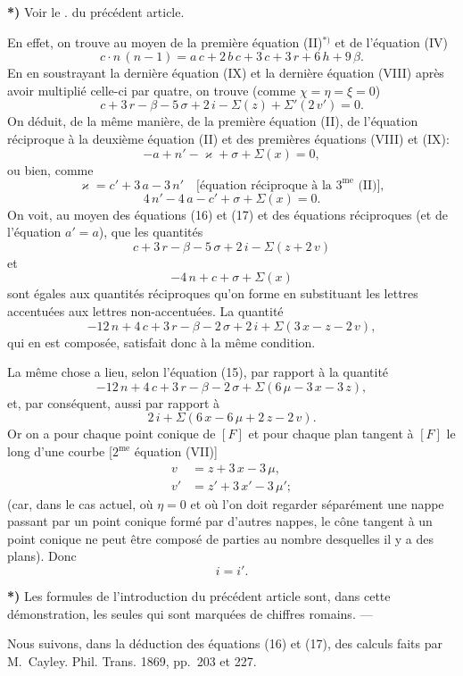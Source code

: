 \documentclass{article}
\begin{document}
\textbf{*)} Voir le . du précédent article.

En effet, on trouve au moyen de la première équation (II)${}^{*)}$ et de l'équation (IV)
\[
c \cdot n\,(n - 1) = a\,c + 2\,b\,c + 3\,c + 3\,r + 6\,h + 9\,\beta.
\]
En en soustrayant la dernière équation (IX) et la dernière équation (VIII) après avoir multiplié celle-ci par quatre, on trouve (comme $\chi = \eta = \xi = 0$)
\[
c + 3\,r - \beta - 5\,\sigma + 2\,i - \Sigma(z) + \Sigma'(2\,v') = 0. \tag{16}
\]
On déduit, de la même manière, de la première équation (II), de l'équation réciproque à la deuxième équation (II) et des premières équations (VIII) et (IX):
\[
- a + n' - \varkappa + \sigma + \Sigma(x) = 0,
\]
ou bien, comme
\[
\varkappa = c' + 3\,a - 3\,n' \quad\text{[équation réciproque à la } 3^{\text{me}} \text{ (II)]},
\]
\[
4\,n' - 4\,a - c' + \sigma + \Sigma(x) = 0. \tag{17}
\]
On voit, au moyen des équations (16) et (17) et des équations réciproques (et de l'équation $a' = a$), que les quantités
\[
c + 3\,r - \beta - 5\,\sigma + 2\,i - \Sigma(z + 2\,v)
\]
et
\[
- 4\,n + c + \sigma + \Sigma(x)
\]
sont égales aux quantités réciproques qu'on forme en substituant les lettres accentuées aux lettres non-accentuées. La quantité
\[
- 12\,n + 4\,c + 3\,r - \beta - 2\,\sigma + 2\,i + \Sigma(3\,x - z - 2\,v),
\]
qui en est composée, satisfait donc à la même condition.

La même chose a lieu, selon l'équation (15), par rapport à la quantité
\[
- 12\,n + 4\,c + 3\,r - \beta - 2\,\sigma + \Sigma(6\,\mu - 3\,x - 3\,z),
\]
et, par conséquent, aussi par rapport à
\[
2\,i + \Sigma(6\,x - 6\,\mu + 2\,z - 2\,v).
\]
Or on a pour chaque point conique de $[F]$ et pour chaque plan tangent à $[F]$ le long d'une courbe [$2^{\text{me}}$ équation (VII)]
\[
\begin{aligned}
v &= z + 3\,x - 3\,\mu, \\
v' &= z' + 3\,x' - 3\,\mu';
\end{aligned}
\]
(car, dans le cas actuel, où $\eta = 0$ et où l'on doit regarder séparément une nappe passant par un point conique formé par d'autres nappes, le cône tangent à un point conique ne peut être composé de parties au nombre desquelles il y a des plans). Donc
\[
i = i'.
\]

\textbf{*)} Les formules de l'introduction du précédent article sont, dans cette démonstration, les seules qui sont marquées de chiffres romains. ---

Nous suivons, dans la déduction des équations (16) et (17), des calculs faits par M.~Cayley. Phil. Trans. 1869, pp.~203 et 227.
\end{document}
